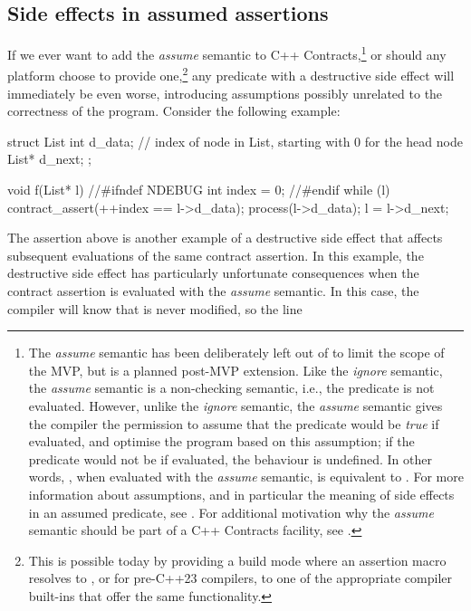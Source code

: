 
\subsection{Side effects in assumed assertions}
\label{subsec:assume}

If we ever want to add the \emph{assume} semantic to C++ Contracts,\footnote{The \emph{assume} semantic has been deliberately left out of \cite{P2900R6} to limit the scope of the MVP, but is a planned post-MVP extension. Like the \emph{ignore} semantic, the \emph{assume} semantic is a non-checking semantic, i.e., the predicate is not evaluated. However, unlike the \emph{ignore} semantic, the \emph{assume} semantic gives the compiler the permission to assume that the predicate would be \emph{true} if evaluated, and optimise the program based on this assumption; if the predicate would not be  if evaluated, the behaviour is undefined. In other words, \mbox{}, when evaluated with the \emph{assume} semantic, is equivalent to \tcode{[[assume(X)]]}. For more information about assumptions, and in particular the meaning of side effects in an assumed predicate, see \cite{P1774R8}. For additional motivation why the \emph{assume} semantic should be part of a C++ Contracts facility, see \cite{P3100R0}.} or should any platform choose to provide one,\footnote{This is possible today by providing a build mode where an assertion macro resolves to \tcode{[[assume(X)]]}, or for pre-C++23 compilers, to one of the appropriate compiler built-ins that offer the same functionality.} any predicate with a destructive side effect will immediately be even worse, introducing
assumptions possibly unrelated to the correctness of the program. Consider the following example:
\begin{codeblock}
struct List { 
  int d_data;  // index of node in List, starting with 0 for the head node
  List* d_next;
};

void f(List* l) {
//\#ifndef NDEBUG
  int index = 0;
//\#endif
  while (l) {
    contract_assert(++index == l->d_data);
    process(l->d_data);
    l = l->d_next;
  }
}
\end{codeblock}
The assertion above is another example of a destructive side effect that affects subsequent evaluations of the same contract assertion. In this example, the destructive side effect has particularly unfortunate consequences when the contract assertion is evaluated with the \emph{assume} semantic. In this case, the compiler will know that  is never modified, so the line 

